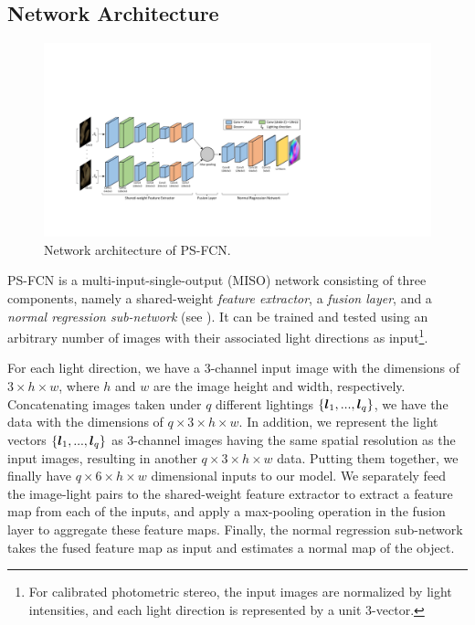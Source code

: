 \subsection{Network Architecture}
\label{sub:Network Architecture}

\begin{figure}[t] \centering
    \includegraphics[width=\textwidth]{ch-psfcn/images/Method/network_v2}
    \caption{Network architecture of PS-FCN.} \label{fig:network}
\end{figure}

PS-FCN is a multi-input-single-output (MISO) network consisting of three components, namely a shared-weight \emph{feature extractor}, a \emph{fusion layer}, and a \emph{normal regression sub-network} (see ). It can be trained and tested using an arbitrary number of images with their associated light directions as input\footnote{For calibrated photometric stereo, the input images are normalized by light intensities, and each light direction is represented by a unit $3$-vector.}.

For each light direction, we have a $3$-channel input image with the dimensions of $3 \times h \times w$, where $h$ and $w$ are the image height and width, respectively. Concatenating images taken under $q$ different lightings $\{\boldsymbol{l}_1, ..., \boldsymbol{l}_q\}$, we have the data with the dimensions of $q \times 3 \times h \times w$. In addition, we represent the light vectors $\{\boldsymbol{l}_1, ..., \boldsymbol{l}_q\}$ as $3$-channel images having the same spatial resolution as the input images, resulting in another $q \times 3 \times h \times w$ data. Putting them together, we finally have $q \times 6 \times h \times w$ dimensional inputs to our model.
We separately feed the image-light pairs to the shared-weight feature extractor to extract a feature map from each of the inputs, and apply a max-pooling operation in the fusion layer to aggregate these feature maps. Finally, the normal regression sub-network takes the fused feature map as input and estimates a normal map of the object.

